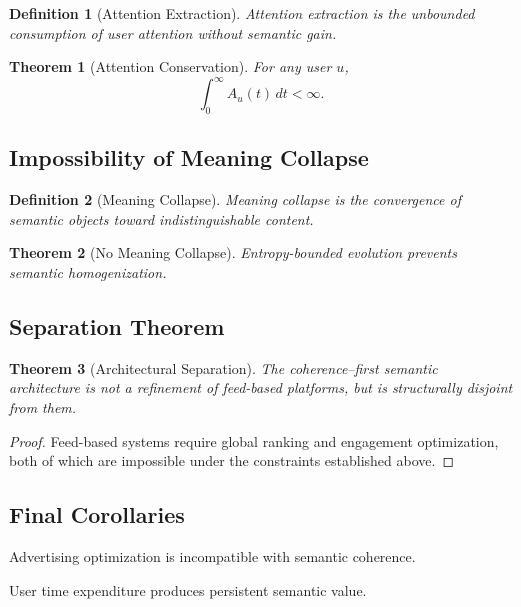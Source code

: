 \documentclass[11pt]{article}
\newtheorem{definition}{Definition}
\newtheorem{theorem}{Theorem}
\begin{document}
\begin{definition}[Attention Extraction]
Attention extraction is the unbounded consumption of user attention without semantic gain.
\end{definition}

\begin{theorem}[Attention Conservation]
For any user $u$,
\[
\int_0^\infty A_u(t)\, dt < \infty.
\]
\end{theorem}

\subsection{Impossibility of Meaning Collapse}

\begin{definition}[Meaning Collapse]
Meaning collapse is the convergence of semantic objects toward indistinguishable content.
\end{definition}

\begin{theorem}[No Meaning Collapse]
Entropy-bounded evolution prevents semantic homogenization.
\end{theorem}

\subsection{Separation Theorem}

\begin{theorem}[Architectural Separation]
The coherence--first semantic architecture is not a refinement of feed-based platforms, but
is structurally disjoint from them.
\end{theorem}

\begin{proof}
Feed-based systems require global ranking and engagement optimization, both of which are
impossible under the constraints established above.
\end{proof}

\subsection{Final Corollaries}

\begin{corollary}
Advertising optimization is incompatible with semantic coherence.
\end{corollary}

\begin{corollary}
User time expenditure produces persistent semantic value.
\end{corollary}
\end{document}
